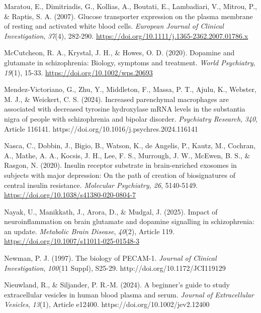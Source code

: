 \documentclass[authordate, empirical]{jote-new-article}
\begin{document}
	Maratou, E., Dimitriadis, G., Kollias, A., Boutati, E., Lambadiari, V., Mitrou, P., \& Raptis, S. A. (2007). Glucose transporter expression on the plasma membrane of resting and activated white blood cells. \emph{European Journal of Clinical Investigation},\emph{ 37}(4), 282-290. \href{https://doi.org/10.1111/j.1365-2362.2007.01786.x}{https://doi.org/10.1111/j.1365-2362.2007.01786.x}



	McCutcheon, R. A., Krystal, J. H., \& Howes, O. D. (2020). Dopamine and glutamate in schizophrenia: Biology, symptoms and treatment. \emph{World Psychiatry},\emph{ 19}(1), 15-33. \href{https://doi.org/10.1002/wps.20693}{https://doi.org/10.1002/wps.20693}



	Mendez-Victoriano, G., Zhu, Y., Middleton, F., Massa, P. T., Ajulu, K., Webster, M. J., \& Weickert, C. S. (2024). Increased parenchymal macrophages are associated with decreased tyrosine hydroxylase mRNA levels in the substantia nigra of people with schizophrenia and bipolar disorder. \emph{Psychiatry Research},\emph{ 340}, Article 116141. https://doi.org/10.1016/j.psychres.2024.116141



	Nasca, C., Dobbin, J., Bigio, B., Watson, K., de Angelis, P., Kautz, M., Cochran, A., Mathe, A. A., Kocsis, J. H., Lee, F. S., Murrough, J. W., McEwen, B. S., \& Rasgon, N. (2020). Insulin receptor substrate in brain-enriched exosomes in subjects with major depression: On the path of creation of biosignatures of central insulin resistance. \emph{Molecular Psychiatry, 26}, 5140-5149. \href{https://doi.org/10.1038/s41380-020-0804-7}{https://doi.org/10.1038/s41380-020-0804-7}



	Nayak, U., Manikkath, J., Arora, D., \& Mudgal, J. (2025). Impact of neuroinflammation on brain glutamate and dopamine signalling in schizophrenia: an update. \emph{Metabolic Brain Disease},\emph{ 40}(2), Article 119. \href{https://doi.org/10.1007/s11011-025-01548-3}{https://doi.org/10.1007/s11011-025-01548-3}



	Newman, P. J. (1997). The biology of PECAM-1. \emph{Journal of Clinical Investigation},\emph{ 100}(11 Suppl), S25-29. http://doi.org/10.1172/JCI119129



	Nieuwland, R., \& Siljander, P. R.-M. (2024). A beginner's guide to study extracellular vesicles in human blood plasma and serum. \emph{Journal of Extracellular Vesicles},\emph{ 13}(1), Article e12400. https://doi.org/10.1002/jev2.12400
\end{document}
